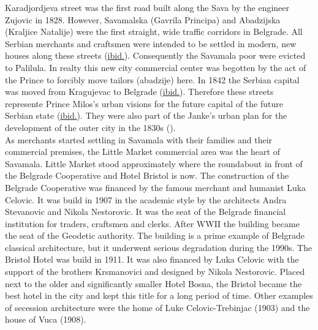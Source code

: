 \documentclass[11pt]{report}
\begin{document}
Karadjordjeva street was the first road built along the Sava by the engineer Zujovic in 1828. However, Savamalska (Gavrila Principa) and Abadzijska (Kraljice Natalije) were the first straight, wide traffic corridors in Belgrade. All Serbian merchants and craftsmen were intended to be settled in modern, new houses along these streets (\href{Doytchinov}{ibid.}).
Consequently the Savamala poor were evicted to Palilula. 
In realty this new city commercial center was begotten by the act of the Prince to forcibly move tailors (abadzije) here.
In 1842 the Serbian capital was moved from Kragujevac to Belgrade (\href{ref}{ibid.}).
Therefore these streets represente Prince Milos’s urban visions for the future capital of the future Serbian state (\href{ref}{ibid.}).
They were also part of the Janke's urban plan for the development of the outer city in the 1830s  (\href{Blagojevic}{\citealt{blagojevic_urban_2009}}). 
\\

As merchants started settling in Savamala with their families and their commercial premises, the Little Market commercial area was the heart of Savamala. Little Market stood approximately where the roundabout in front of the Belgrade Cooperative and Hotel Bristol is now. The construction of the Belgrade Cooperative was financed by the famous merchant and humanist Luka Celovic. It was build in 1907 in the academic style by the architects Andra Stevanovic and Nikola Nestorovic. It was the seat of the Belgrade financial institution for traders, craftsmen and clerks. After WWII the building became the seat of the Geodetic authority. The building is a prime example of Belgrade classical architecture, but it underwent serious degradation during the 1990s.  The Bristol Hotel was build in 1911. It was also financed by Luka Celovic with the support of the brothers Krsmanovici and designed by Nikola Nestorovic. Placed next to the older and significantly smaller Hotel Bosna, the Bristol became the best hotel in the city and kept this title for a long period of time. Other examples of secession architecture were the home of Luke Celovic-Trebinjac (1903) and the house of Vuca (1908).
\\
\end{document}
